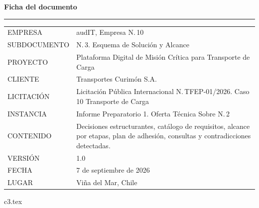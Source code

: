 \documentclass[12pt, letterpaper, table, xcdraw]{inf-pucv}
\begin{document}

\thispagestyle{folioficha}
\vspace*{1.2cm}
{\color{audITnavy}\fontsize{28}{32}\selectfont\bfseries Ficha del documento}

\vspace{10pt}
{\color{audITteal}\rule{\linewidth}{2pt}}

\vspace{22pt}
{\small
\begin{longtable}{@{}p{3.5cm}p{10.5cm}@{}}
\color{audITgris}EMPRESA & \color{black}audIT, Empresa N.\textordmasculine{}\,10 \\
\color{audITgris}SUBDOCUMENTO & \color{black}N.\textordmasculine{}\,3. Esquema de Solución y Alcance \\
\color{audITgris}PROYECTO & \color{black}Plataforma Digital de Misión Crítica para Transporte de Carga \\
\color{audITgris}CLIENTE & \color{black}Transportes Curimón S.A. \\
\color{audITgris}LICITACIÓN & \color{black}Licitación Pública Internacional N.\textordmasculine{}\,TFEP-01/2026. Caso 10 Transporte de Carga \\
\color{audITgris}INSTANCIA & \color{black}Informe Preparatorio 1. Oferta Técnica Sobre N.\textordmasculine{}\,2 \\
\color{audITgris}CONTENIDO & \color{black}Decisiones estructurantes, catálogo de requisitos, alcance por etapas, plan de adhesión, consultas y contradicciones detectadas. \\
\color{audITgris}VERSIÓN & \color{black}1.0 \\
\color{audITgris}FECHA & \color{black}7 de septiembre de 2026 \\
\color{audITgris}LUGAR & \color{black}Viña del Mar, Chile \\
\end{longtable}}
\clearpage

\renewcommand{\contentsname}{Índice}
\tableofcontents
\clearpage

{c3.tex}

\clearpage
{}
{}
\printbibliography[title={Bibliografía}]
\end{document}
